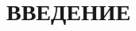 \sectionbreak \section*{ 
    \gostTitleFont
    \redline
    ВВЕДЕНИЕ
}
\titlespace

{\gostFont

    \par \redline 
    

}